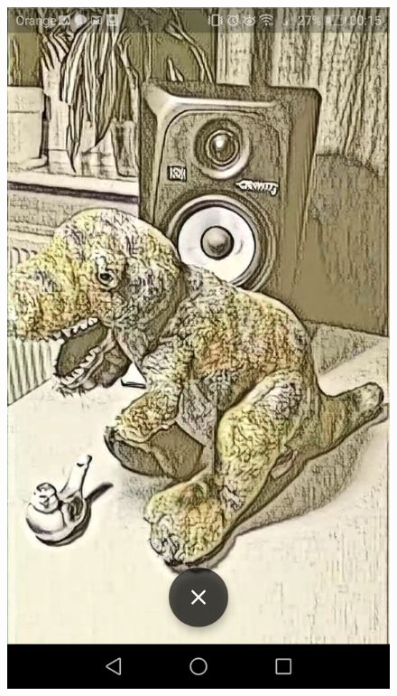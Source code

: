 \documentclass[../Main.tex]{subfiles}
\begin{document}
\begin{figure}[H]
        \includegraphics[width=\linewidth]{Chapters/dino2.jpg}
    \endminipage\hfill

\end{figure}
\end{document}
